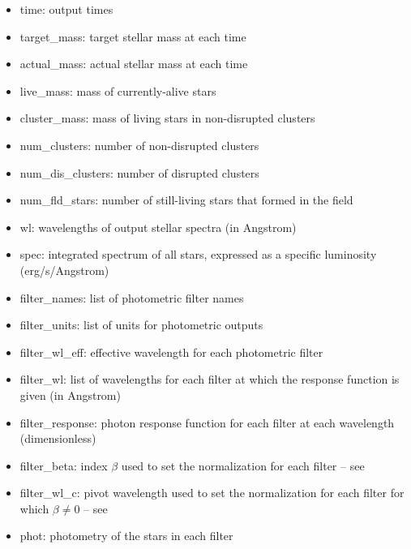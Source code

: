 \documentclass[letterpaper,10pt,english]{sphinxmanual}
\begin{document}
\begin{itemize}
\item {} 
time: output times

\item {} 
target\_mass: target stellar mass at each time

\item {} 
actual\_mass: actual stellar mass at each time

\item {} 
live\_mass: mass of currently-alive stars

\item {} 
cluster\_mass: mass of living stars in non-disrupted clusters

\item {} 
num\_clusters: number of non-disrupted clusters

\item {} 
num\_dis\_clusters: number of disrupted clusters

\item {} 
num\_fld\_stars: number of still-living stars that formed in the field

\item {} 
wl: wavelengths of output stellar spectra (in Angstrom)

\item {} 
spec: integrated spectrum of all stars, expressed as a specific luminosity (erg/s/Angstrom)

\item {} 
filter\_names: list of photometric filter names

\item {} 
filter\_units: list of units for photometric outputs

\item {} 
filter\_wl\_eff: effective wavelength for each photometric filter

\item {} 
filter\_wl: list of wavelengths for each filter at which the response function is given (in Angstrom)

\item {} 
filter\_response: photon response function for each filter at each wavelength (dimensionless)

\item {} 
filter\_beta: index \(\beta\) used to set the normalization for each filter -- see {\hyperref[intro:ssec-spec-phot]{\emph{}}}

\item {} 
filter\_wl\_c: pivot wavelength used to set the normalization for each filter for which \(\beta \neq 0\) -- see {\hyperref[intro:ssec-spec-phot]{\emph{}}}

\item {} 
phot: photometry of the stars in each filter

\end{itemize}
\end{document}
